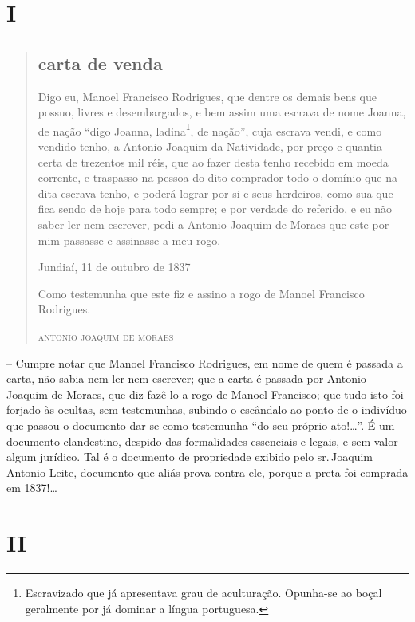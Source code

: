 \section{I}

\begin{quote}
\subsection{carta de venda}

Digo eu, Manoel Francisco Rodrigues, que dentre os demais bens que
possuo, livres e desembargados, e bem assim uma escrava de nome Joanna,
de nação ``digo Joanna, ladina\footnote{ Escravizado que já apresentava
  grau de aculturação. Opunha-se ao boçal geralmente por já dominar a
  língua portuguesa.}, de nação'', cuja escrava vendi, e como vendido
tenho, a Antonio Joaquim da Natividade, por preço e quantia certa de
trezentos mil réis, que ao fazer desta tenho recebido em moeda corrente,
e traspasso na pessoa do dito comprador todo o domínio que na dita
escrava tenho, e poderá lograr por si e seus herdeiros, como sua que
fica sendo de hoje para todo sempre; e por verdade do referido, e eu não
saber ler nem escrever, pedi a Antonio Joaquim de Moraes que este por
mim passasse e assinasse a meu rogo.

\begin{flushright}
Jundiaí, 11 de outubro de 1837

Como testemunha que este fiz e assino a rogo de Manoel Francisco Rodrigues.

\textsc{antonio joaquim de moraes}
\end{flushright}
\end{quote}

-- Cumpre notar que Manoel Francisco Rodrigues, em nome de quem é
passada a carta, não sabia nem ler nem escrever; que a carta é passada
por Antonio Joaquim de Moraes, que diz fazê-lo a rogo de Manoel
Francisco; que tudo isto foi forjado às ocultas, sem testemunhas,
subindo o escândalo ao ponto de o indivíduo que passou o documento
dar-se como testemunha ``do seu próprio ato!\ldots{}''. É um documento
clandestino, despido das formalidades essenciais e legais, e sem valor
algum jurídico. Tal é o documento de propriedade exibido pelo sr.\,Joaquim Antonio Leite, documento que aliás prova contra ele, porque a
preta foi comprada em 1837!\ldots{}

\section{II}


